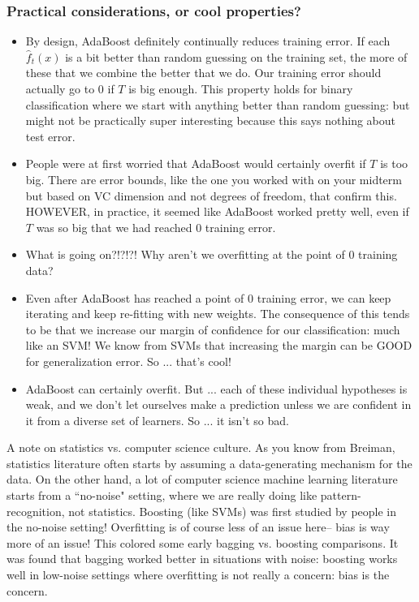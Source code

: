 \subsubsection{Practical considerations, or cool properties?}
\begin{itemize}
\item By design, AdaBoost definitely continually reduces training error. If each $\hat{f}_t(x)$ is a bit better than random guessing on the training set, the more of these that we combine the better that we do. Our training error should actually go to $0$ if $T$ is big enough. This property holds for binary classification where we start with anything better than random guessing: but might not be practically super interesting because this says nothing about test error. 
\item People were at first worried that AdaBoost would certainly overfit if $T$ is too big. There are error bounds, like the one you worked with on your midterm but based on VC dimension and not degrees of freedom, that confirm this. HOWEVER, in practice, it seemed like AdaBoost worked pretty well, even if $T$ was so big that we had reached $0$ training error.
\item What is going on?!?!?! Why aren't we overfitting at the point of $0$ training data? 
\item Even after AdaBoost has reached a point of $0$ training error, we can keep iterating and keep re-fitting with new weights. The consequence of this tends to be that we increase our margin of confidence for our classification: much like an SVM! We know from SVMs that increasing the margin can be GOOD for generalization error. So ... that's cool! 
\item AdaBoost can certainly overfit. But ... each of these individual hypotheses is weak, and we don't let ourselves make a prediction unless we are confident in it from a diverse set of learners. So ... it isn't so bad.
\end{itemize}


A note on statistics vs. computer science culture. As you know from Breiman, statistics literature often starts by assuming a data-generating mechanism for the data. On the other hand, a lot of computer science machine learning literature starts from a ``no-noise" setting, where we are really doing like pattern-recognition, not statistics. Boosting (like SVMs) was first studied by people in the no-noise setting! Overfitting is of course less of an issue here-- bias is way more of an issue! This colored some early bagging vs. boosting comparisons. It was found that bagging worked better in situations with noise: boosting works well in low-noise settings where overfitting is not really a concern: bias is the concern. 

